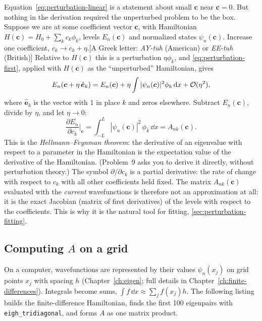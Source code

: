 Equation~\eqref{eq:perturbation-linear} is a statement about small $\bm c$ near $\bm c=0$. But nothing in the derivation required the unperturbed problem to be the box. Suppose we are at some coefficient vector $\bm c$, with Hamiltonian $H(\bm c)=H_0+\sum_kc_k\phi_k$, levels $E_n(\bm c)$ and normalized states $\psi_n(\bm c)$. Increase one coefficient, $c_k\to c_k+\eta$.[A Greek letter: \emph{AY-tuh} (American) or \emph{EE-tuh} (British)] Relative to $H(\bm c)$ this is a perturbation $\eta\phi_k$, and \cref{eq:perturbation-first}, applied with $H(\bm c)$ as the ``unperturbed'' Hamiltonian, gives
\[
E_n(\bm c+\eta\,\hat{\bm e}_k)=E_n(\bm c)+\eta\int|\psi_n(\bm c)|^2\phi_k\,\mathrm{d} x+\mathcal{O}(\eta^2),
\]
where $\hat{\bm e}_k$ is the vector with 1 in place $k$ and zeros elsewhere. Subtract $E_n(\bm c)$, divide by $\eta$, and let $\eta\to0$:
\begin{equation}
\frac{\partial E_n}{\partial c_k}\bigg|_{\bm c}=\int_{-L}^{L}|\psi_n(\bm c)|^2\,\phi_k\,\dd x=A_{nk}(\bm c).
\label{eq:perturbation-HF}
\end{equation}
This is the \emph{Hellmann--Feynman theorem}: the derivative of an eigenvalue with respect to a parameter in the Hamiltonian is the expectation value of the derivative of the Hamiltonian. (Problem~9 asks you to derive it directly, without perturbation theory.) The symbol $\partial/\partial c_k$ is a partial derivative: the rate of change with respect to $c_k$ with all other coefficients held fixed. The matrix $A_{nk}(\bm c)$ evaluated with the \emph{current} wavefunctions is therefore not an approximation at all: it is the exact Jacobian (matrix of first derivatives) of the levels with respect to the coefficients. This is why it is the natural tool for fitting, \cref{sec:perturbation-fitting}.

\subsection{Computing $A$ on a grid}

On a computer, wavefunctions are represented by their values $\psi_n(x_j)$ on grid points $x_j$ with spacing $h$ (Chapter~\ref{ch:eigen}; full details in Chapter~\ref{ch:finite-differences}). Integrals become sums, $\int f\,\dd x\approx\sum_jf(x_j)h$. The following listing builds the finite-difference Hamiltonian, finds the first 100 eigenpairs with \texttt{eigh\_tridiagonal}, and forms $A$ as one matrix product.

